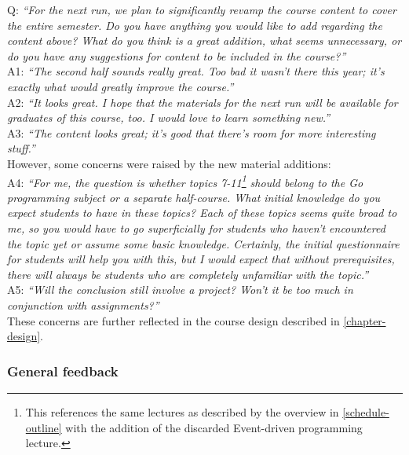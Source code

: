 \documentclass[
  digital,
  color,
  oneside,
  nosansbold,
  nocolorbold,
  lof,
  nolot,
]{fithesis4}
\begin{document}
\noindent
Q: \textit{\enquote{For the next run, we plan to significantly revamp the course content to cover the entire semester. Do you have anything you would like to add regarding the content above? What do you think is a great addition, what seems unnecessary, or do you have any suggestions for content to be included in the course?}} \\

\noindent
A1: \textit{\enquote{The second half sounds really great. Too bad it wasn't there this year; it's exactly what would greatly improve the course.}} \\

\noindent
A2: \textit{\enquote{It looks great. I hope that the materials for the next run will be available for graduates of this course, too. I would love to learn something new.}} \\

\noindent
A3: \textit{\enquote{The content looks great; it's good that there's room for more interesting stuff.}} \\

\noindent
However, some concerns were raised by the new material additions: \\

\noindent
A4: \textit{\enquote{For me, the question is whether topics 7-11\footnote{This references the same lectures as described by the overview in \cref{schedule-outline} with the addition of the discarded Event-driven programming lecture.} should belong to the Go programming subject or a separate half-course. What initial knowledge do you expect students to have in these topics? Each of these topics seems quite broad to me, so you would have to go superficially for students who haven't encountered the topic yet or assume some basic knowledge. Certainly, the initial questionnaire for students will help you with this, but I would expect that without prerequisites, there will always be students who are completely unfamiliar with the topic.}} \\

\noindent
A5: \textit{\enquote{Will the conclusion still involve a project? Won't it be too much in conjunction with assignments?}} \\

\noindent
These concerns are further reflected in the course design described in \cref{chapter-design}. \\

\subsubsection{General feedback}\label{general-feedback}
\end{document}
